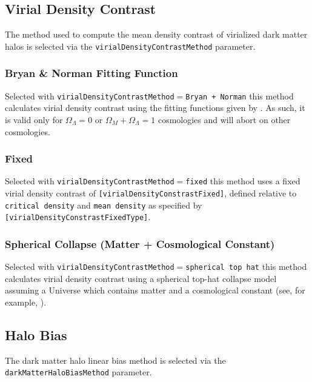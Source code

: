 \subsection{Virial Density Contrast}\label{sec:VirialDensityConstrast}

The method used to compute the mean density contrast of virialized dark matter halos is selected via the {\tt virialDensityContrastMethod} parameter.

\subsubsection{Bryan \& Norman Fitting Function}

Selected with {\tt virialDensityContrastMethod}$=${\tt Bryan + Norman} this method calculates virial density contrast using the fitting functions given by \cite{bryan_statistical_1998}. As such, it is valid only for $\Omega_\Lambda=0$ or $\Omega_M+\Omega_\Lambda=1$ cosmologies and will abort on other cosmologies.

\subsubsection{Fixed}

Selected with {\tt virialDensityContrastMethod}$=${\tt fixed} this method uses a fixed virial density contrast of {\tt [virialDensityConstrastFixed]}, defined relative to {\tt critical density} and {\tt mean density} as specified by {\tt [virialDensityConstrastFixedType]}.

\subsubsection{Spherical Collapse (Matter + Cosmological Constant)}

Selected with {\tt virialDensityContrastMethod}$=${\tt spherical top hat} this method calculates virial density contrast using a spherical top-hat collapse model assuming a Universe which contains matter and a cosmological constant (see, for example, \citealt{percival_cosmological_2005}).

\subsection{Halo Bias}

The dark matter halo linear bias method is selected via the {\tt darkMatterHaloBiasMethod} parameter.

